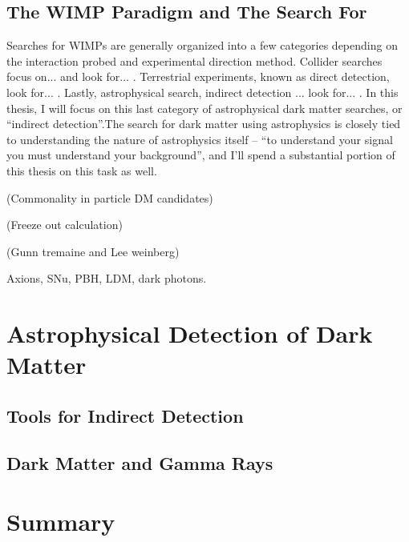 \subsection{The WIMP Paradigm and The Search For}

Searches for WIMPs are generally organized into a few categories depending on the interaction probed and experimental direction method. Collider searches focus on... and look for... . Terrestrial experiments, known as direct detection, look for... . Lastly, astrophysical search, indirect detection ... look for... .  In this thesis, I will focus on this last category of astrophysical dark matter searches, or ``indirect detection''.The search for dark matter using astrophysics is closely tied to understanding the nature of astrophysics itself -- ``to understand your signal you must understand your background'', and I'll spend a substantial portion of this thesis on this task as well. 


(Commonality in particle DM candidates)

(Freeze out calculation)

(Gunn tremaine and Lee weinberg)

Axions, SNu, PBH, LDM, dark photons.

\section{Astrophysical Detection of Dark Matter}
\label{sec:astrodm}

\subsection{Tools for Indirect Detection}

\subsection{Dark Matter and Gamma Rays}

\section{Summary}
\label{sec:summary}



